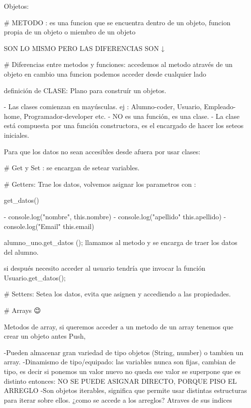 Objetos:🎇

# METODO : es una funcion que se encuentra dentro de un objeto, funcion propia de un objeto o miembro de un objeto

SON LO MISMO PERO LAS DIFERENCIAS SON ↓

# Diferencias entre metodos y funciones: accedemos al metodo através de un objeto en cambio una funcion podemos acceder desde cualquier lado

definición de CLASE: Plano para construír un objetos.

- Las clases comienzan en mayúsculas. ej : Alumno-coder, Usuario, Empleado-home, Programador-developer etc.
- NO es una función, es una clase.
- La clase está compuesta por una función constructora, es el encargado de hacer los seteos iniciales.

Para que los datos no sean accesibles desde afuera por usar clases:

# Get y Set : se encargan de setear variables.

# Getters: Trae los datos, volvemos asignar los parametros con :

get_datos()
{

- console.log("nombre", this.nombre)
- console.log("apellido" this.apellido)
- console.log("Email" this.email)  
}

  alumno_uno.get_datos ();
  llamamos al metodo y se encarga de traer los datos del alumno.

  si después necesito acceder al usuario tendría que invocar la función
  Usuario.get_datos();

# Setters: Setea los datos, evita que asignen y accediendo a las propiedades.

# Arrays 😉

Metodos de array, si queremos acceder a un metodo de un array tenemos que crear un objeto antes
Push,

-Pueden almacenar gran variedad de tipo objetos (String, number) o tambien un array.
-Dinamismo de tipo/equipado: las variables nunca son fijas, cambian de tipo, es decir si ponemos un valor nuevo
no queda ese valor se superpone que es distinto entonces:
NO SE PUEDE ASIGNAR DIRECTO, PORQUE PISO EL ARREGLO
-Son objetos iterables, significa que permite usar distintas estructuras para iterar sobre ellos.  
¿como se accede a los arreglos?
Atraves de sus indices